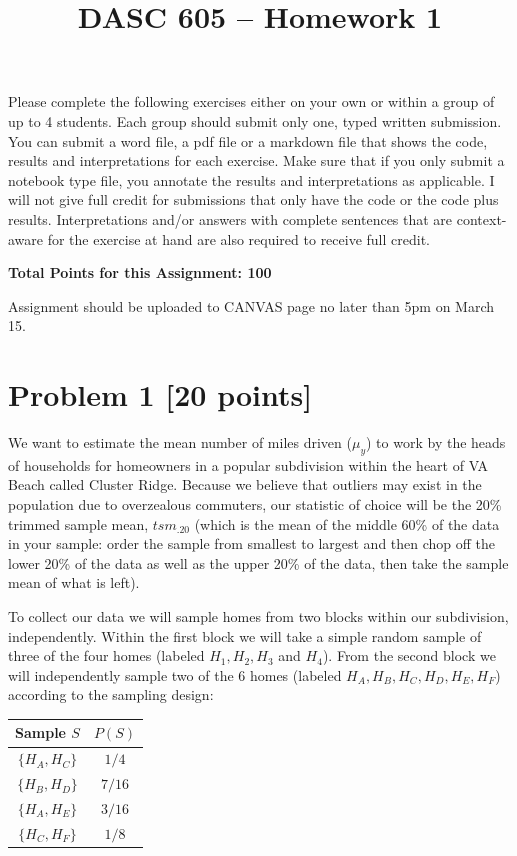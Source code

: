 \documentclass[12pt]{article}
\title{DASC 605 -- Homework 1}
\date{}
\begin{document}
\maketitle

Please complete the following exercises either on your own or within a group of up to 4 students. Each group should submit only one, typed written submission. You can submit a word file, a pdf file or a markdown file that shows the code, results and interpretations for each exercise. Make sure that if you only submit a notebook type file, you annotate the results and interpretations as applicable. I will not give full credit for submissions that only have the code or the code plus results. Interpretations and/or answers with complete sentences that are context-aware for the exercise at hand are also required to receive full credit.

\bigskip

\textbf{Total Points for this Assignment: 100}

\bigskip

Assignment should be uploaded to CANVAS page no later than 5pm on March 15.

\section*{Problem 1 [20 points]}

We want to estimate the mean number of miles driven ($\mu_y$) to work by the heads of households for homeowners in a popular subdivision within the heart of VA Beach called Cluster Ridge. Because we believe that outliers may exist in the population due to overzealous commuters, our statistic of choice will be the 20\% trimmed sample mean, $tsm_{.20}$ (which is the mean of the middle 60\% of the data in your sample: order the sample from smallest to largest and then chop off the lower 20\% of the data as well as the upper 20\% of the data, then take the sample mean of what is left).

To collect our data we will sample homes from two blocks within our subdivision, independently. Within the first block we will take a simple random sample of three of the four homes (labeled $H_1, H_2, H_3$ and $H_4$). From the second block we will independently sample two of the 6 homes (labeled $H_A, H_B, H_C, H_D, H_E, H_F$) according to the sampling design:

\begin{center}
\begin{tabular}{cc}
\toprule
Sample $S$ & $P(S)$ \\
\midrule
$\{H_A,H_C\}$ & $1/4$ \\
$\{H_B,H_D\}$ & $7/16$ \\
$\{H_A,H_E\}$ & $3/16$ \\
$\{H_C,H_F\}$ & $1/8$ \\
\bottomrule
\end{tabular}
\end{center}
\end{document}
